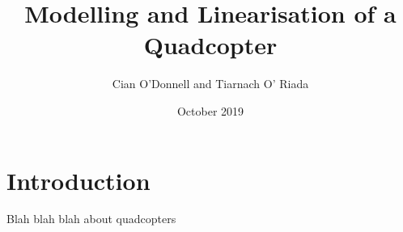 \documentclass[a4paper,11pt]{article}
\date{October 2019}
\title{Modelling and Linearisation of a Quadcopter}
\author{Cian O'Donnell and Tiarnach O' Riada}
\begin{document}
\maketitle

\newpage
\tableofcontents

\newpage
\section{Introduction}                  %
Blah blah blah about quadcopters









\end{document}
